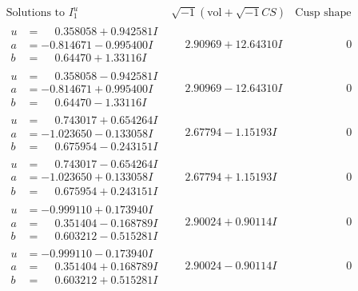 \documentclass[1p]{elsarticle_modified}
\theoremstyle{definition}
\newcommand{\I}{\sqrt{-1}}
\begin{document}
$$\begin{array}{c|c|c}  
\text{Solutions to }I^u_{1}& \I (\text{vol} + \sqrt{-1}CS) & \text{Cusp shape}\\
 \hline 
\begin{aligned}
u &= \phantom{-}0.358058 + 0.942581 I \\
a &= -0.814671 - 0.995400 I \\
b &= \phantom{-}0.64470 + 1.33116 I\end{aligned}
 & \phantom{-}2.90969 + 12.64310 I & \phantom{-0.000000 } 0 \\ \hline\begin{aligned}
u &= \phantom{-}0.358058 - 0.942581 I \\
a &= -0.814671 + 0.995400 I \\
b &= \phantom{-}0.64470 - 1.33116 I\end{aligned}
 & \phantom{-}2.90969 - 12.64310 I & \phantom{-0.000000 } 0 \\ \hline\begin{aligned}
u &= \phantom{-}0.743017 + 0.654264 I \\
a &= -1.023650 - 0.133058 I \\
b &= \phantom{-}0.675954 - 0.243151 I\end{aligned}
 & \phantom{-}2.67794 - 1.15193 I & \phantom{-0.000000 } 0 \\ \hline\begin{aligned}
u &= \phantom{-}0.743017 - 0.654264 I \\
a &= -1.023650 + 0.133058 I \\
b &= \phantom{-}0.675954 + 0.243151 I\end{aligned}
 & \phantom{-}2.67794 + 1.15193 I & \phantom{-0.000000 } 0 \\ \hline\begin{aligned}
u &= -0.999110 + 0.173940 I \\
a &= \phantom{-}0.351404 - 0.168789 I \\
b &= \phantom{-}0.603212 - 0.515281 I\end{aligned}
 & \phantom{-}2.90024 + 0.90114 I & \phantom{-0.000000 } 0 \\ \hline\begin{aligned}
u &= -0.999110 - 0.173940 I \\
a &= \phantom{-}0.351404 + 0.168789 I \\
b &= \phantom{-}0.603212 + 0.515281 I\end{aligned}
 & \phantom{-}2.90024 - 0.90114 I & \phantom{-0.000000 } 0 \\ \hline\begin{aligned}

\end{aligned}
\end{array}$$
\end{document}
